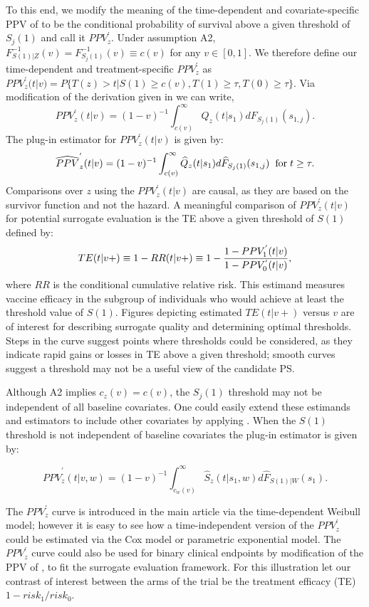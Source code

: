 \documentclass[times, 11pt]{article}
\begin{document}
To this end, we modify the meaning of the time-dependent and covariate-specific PPV of \citet{Zheng10} to be the conditional probability of survival above a given threshold of $S_j(1)$ and call it $PPV_z^{'}$. Under assumption A2, $F^{-1}_{S(1)|Z}(v) = F^{-1}_{S_j(1)}(v)\equiv c(v)$ for any $v \in [0,1]$. We therefore define our time-dependent and treatment-specific $PPV_z^{'}$ as $PPV^{'}_z(t|v)=P\{T(z) > t | S(1) \geq c(v), T(1) \geq \tau, T(0) \geq \tau\}$.
Via modification of the derivation given in \citet{Moskowitz04a} we can write, 
\[
PPV^{'}_z(t|v)=(1 - v)^{-1}  \int_{c(v)}^{\infty} {Q_z(t|s_1)dF_{S_j(1)}}(s_{1,j}).
\]
The plug-in estimator for $PPV_z^{'}(t|v)$ is given by:
\[
\widehat{PPV}^{'}_z(t|v) = (1 - v)^{-1} \int_{c(v)}^{\infty} {\widehat{Q}_z(t|s_1)d\widehat{F}_{S_j(1)}}(s_{1,j}) \hspace{2mm} \mbox{for} \hspace{1mm} t \geq \tau.
\]
Comparisons over $z$ using the $PPV^{'}_{z}(t|v)$ are causal, as they are based on the survivor function and not the hazard. A meaningful comparison of $PPV^{'}_z(t|v)$ for potential surrogate evaluation is the TE above a given threshold of $S(1)$ defined by:
\[
TE(t|v+)\equiv 1-RR(t|v+)\equiv 1-{1-PPV^{'}_1(t|v) \over 1-PPV^{'}_0(t|v)}, 
\]
where $RR$ is the conditional cumulative relative risk. This estimand measures vaccine efficacy in the subgroup of individuals who would achieve at least the threshold value of $S(1)$. Figures depicting estimated $TE(t|v+)$ versus $v$ are of interest for describing surrogate quality and determining optimal thresholds. Steps in the curve suggest points where thresholds could be considered, as they indicate rapid gains or losses in TE above a given threshold; smooth curves suggest a threshold may not be a useful view of the candidate PS.

Although A2 implies $c_z(v)=c(v)$, the $S_j(1)$ threshold may not be independent of all baseline covariates. One could easily extend these estimands and estimators to include other covariates by applying \citet{Zheng10}. When the $S(1)$ threshold is not independent of baseline covariates the plug-in estimator is given by:
\begin{singlespace}
\[
\widehat{PPV}^{'}_{z}(t|v,w) = (1 - v)^{-1} \int_{c_w(v)}^{\infty} {\widehat{S}_z(t|s_1,w)d\widehat{F}_{S(1)|W}}(s_1).
\]
\end{singlespace}
The $PPV^{'}_z$ curve is introduced in the main article via the time-dependent Weibull model; however it is easy to see how a time-independent version of the $PPV^{'}_z$ could be estimated via the Cox model or parametric exponential model. The $PPV^{'}_z$ curve could also be used for binary clinical endpoints by modification of the PPV of \citet{Moskowitz04b}, to fit the surrogate evaluation framework. For this illustration let our contrast of interest between the arms of the trial be the treatment efficacy (TE) $1 - {risk_1 / risk_0}$.
\end{document}

